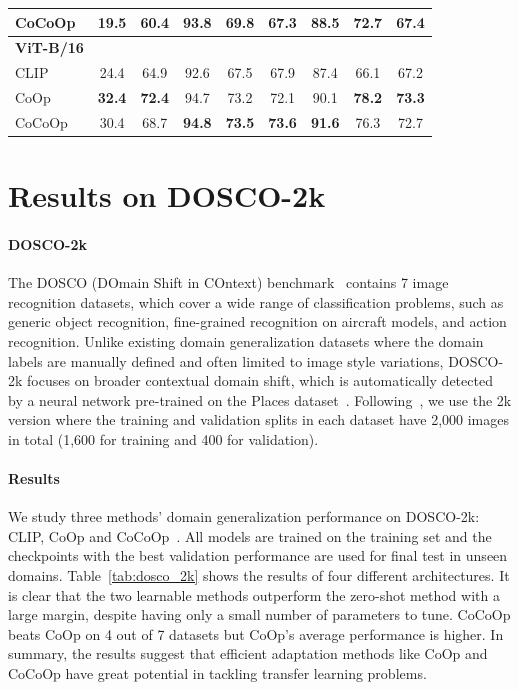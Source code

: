 \begin{table}[t]
\begin{tabular}{l cccccccc}
    CoCoOp & 19.5 & 60.4 & \textbf{93.8} & \textbf{69.8} & \textbf{67.3} & \textbf{88.5} & 72.7 & 67.4 \\
    \midrule
    \textbf{ViT-B/16} & \\
    CLIP & 24.4 & 64.9 & 92.6 & 67.5 & 67.9 & 87.4 & 66.1 & 67.2 \\
    CoOp & \textbf{32.4} & \textbf{72.4} & 94.7 & 73.2 & 72.1 & 90.1 & \textbf{78.2} & \textbf{73.3} \\
    CoCoOp & 30.4 & 68.7 & \textbf{94.8} & \textbf{73.5} & \textbf{73.6} & \textbf{91.6} & 76.3 & 72.7 \\
    \bottomrule
    \end{tabular}
\end{table}

\section{Results on DOSCO-2k} \label{appx:dosco_2k}

\paragraph{DOSCO-2k}
The DOSCO (DOmain Shift in COntext) benchmark~\citep{zhou2022device} contains 7 image recognition datasets, which cover a wide range of classification problems, such as generic object recognition, fine-grained recognition on aircraft models, and action recognition. Unlike existing domain generalization datasets where the domain labels are manually defined and often limited to image style variations, DOSCO-2k focuses on broader contextual domain shift, which is automatically detected by a neural network pre-trained on the Places dataset~\citep{zhou2017places}. Following~\citet{zhou2022device}, we use the 2k version where the training and validation splits in each dataset have 2,000 images in total (1,600 for training and 400 for validation).

\paragraph{Results}
We study three methods' domain generalization performance on DOSCO-2k: CLIP, CoOp and CoCoOp~\citep{zhou2022conditional}. All models are trained on the training set and the checkpoints with the best validation performance are used for final test in unseen domains. Table~\ref{tab:dosco_2k} shows the results of four different architectures. It is clear that the two learnable methods outperform the zero-shot method with a large margin, despite having only a small number of parameters to tune. CoCoOp beats CoOp on 4 out of 7 datasets but CoOp's average performance is higher. In summary, the results suggest that efficient adaptation methods like CoOp and CoCoOp have great potential in tackling transfer learning problems.

